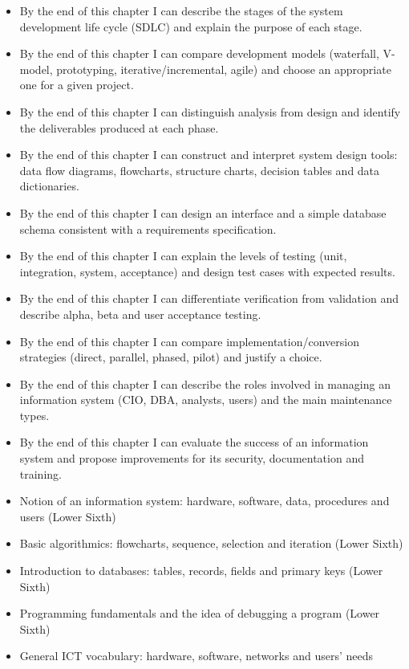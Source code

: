 \documentclass[11pt]{article}
\begin{document}
\begin{objectifs}
\begin{itemize}
\item By the end of this chapter I can describe the stages of the system development life cycle (SDLC) and explain the purpose of each stage.
\item By the end of this chapter I can compare development models (waterfall, V-model, prototyping, iterative/incremental, agile) and choose an appropriate one for a given project.
\item By the end of this chapter I can distinguish analysis from design and identify the deliverables produced at each phase.
\item By the end of this chapter I can construct and interpret system design tools: data flow diagrams, flowcharts, structure charts, decision tables and data dictionaries.
\item By the end of this chapter I can design an interface and a simple database schema consistent with a requirements specification.
\item By the end of this chapter I can explain the levels of testing (unit, integration, system, acceptance) and design test cases with expected results.
\item By the end of this chapter I can differentiate verification from validation and describe alpha, beta and user acceptance testing.
\item By the end of this chapter I can compare implementation/conversion strategies (direct, parallel, phased, pilot) and justify a choice.
\item By the end of this chapter I can describe the roles involved in managing an information system (CIO, DBA, analysts, users) and the main maintenance types.
\item By the end of this chapter I can evaluate the success of an information system and propose improvements for its security, documentation and training.
\end{itemize}
\end{objectifs}

\begin{prerequis}
\begin{itemize}
\item Notion of an information system: hardware, software, data, procedures and users (Lower Sixth)
\item Basic algorithmics: flowcharts, sequence, selection and iteration (Lower Sixth)
\item Introduction to databases: tables, records, fields and primary keys (Lower Sixth)
\item Programming fundamentals and the idea of debugging a program (Lower Sixth)
\item General ICT vocabulary: hardware, software, networks and users' needs
\end{itemize}
\end{prerequis}
\end{document}
